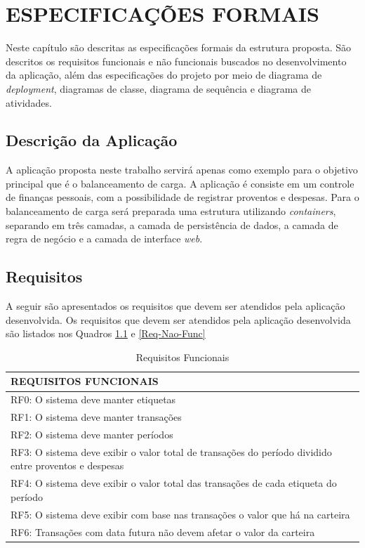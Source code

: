 \chapter{ESPECIFICAÇÕES FORMAIS}
	Neste capítulo são descritas as especificações formais da estrutura proposta. São descritos os requisitos funcionais e não funcionais buscados no desenvolvimento da aplicação, além das especificações do projeto por meio de diagrama de \textit{deployment}, diagramas de classe, diagrama de sequência e diagrama de atividades.
	
\section{Descrição da Aplicação}
	A aplicação proposta neste trabalho servirá apenas como exemplo para o objetivo principal que é o balanceamento de carga. A aplicação é consiste em um controle de finanças pessoais, com a possibilidade de registrar proventos e despesas. Para o balanceamento de carga será preparada uma estrutura utilizando \textit{containers}, separando em três camadas, a camada de persistência de dados, a camada de regra de negócio e a camada de interface \textit{web}.
	
\section{Requisitos}
	A seguir são apresentados os requisitos que devem ser atendidos pela aplicação desenvolvida. Os requisitos que devem ser atendidos pela aplicação desenvolvida são listados nos Quadros \ref{Req-Func} e \ref{Req-Nao-Func}
	
	\begin{table}[h]
		\caption{Requisitos Funcionais}
		\label{Req-Func}
		\begin{tabular}{|l|}
			\hline
			\textbf{REQUISITOS FUNCIONAIS} \\ \hline
			RF0: O sistema deve manter etiquetas \\ \hline
			RF1: O sistema deve manter transações \\ \hline
			RF2: O sistema deve manter períodos \\ \hline
			RF3: O sistema deve exibir o valor total de transações do período dividido entre proventos e despesas \\
			 \hline
	 		RF4: O sistema deve exibir o valor total das transações de cada etiqueta do período \\ \hline
			RF5: O sistema deve exibir com base nas transações o valor que há na carteira \\ \hline
			RF6: Transações com data futura não devem afetar o valor da carteira \\ \hline
		\end{tabular}
	\end{table}

